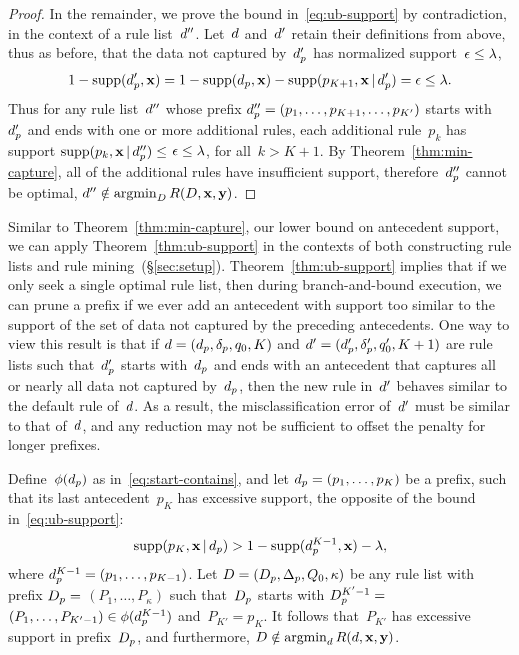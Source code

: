 \begin{proof}
In the remainder, we prove the bound in~\eqref{eq:ub-support} by contradiction,
in the context of a rule list~${d}''$.
%
Let~${d}$ and~${d}'$ retain their definitions from above,
thus as before, that the data not captured by~$d_p'$
has normalized support~${\epsilon \le {\lambda}}$, \ie
\begin{align*}
1 - \textnormal{supp}(d_p', \mathbf{x}) = 1 - \textnormal{supp}(d_p, \mathbf{x}) - \textnormal{supp}(p_{K+1}, \mathbf{x} \,|\, d_p') = \epsilon \le {\lambda}.
\end{align*}
Thus for any rule list~${d}''$ whose prefix
$d_p'' = (p_1, \dots, p_{K+1}, \dots, p_{K'})$ starts
with~$d_p'$ and ends with one or more additional rules,
each additional rule~$p_k$ has support
${\textnormal{supp}(p_k, \mathbf{x} \,|\, d_p'') \le}$ ${\epsilon \le {\lambda}}$,
for all~${k > K+1}$.
%
By Theorem~\ref{thm:min-capture},
all of the additional rules have insufficient support,
therefore~$d_p''$ cannot be optimal,
\ie ${{d}'' \notin \operatorname*{argmin}_{{D}} R({D}, \mathbf{x}, \mathbf{y})}$.
\end{proof}

Similar to Theorem~\ref{thm:min-capture}, our lower bound on
antecedent support, we can apply Theorem~\ref{thm:ub-support}
in the contexts of both constructing rule lists and
rule mining~(\S\ref{sec:setup}).
%
Theorem~\ref{thm:ub-support} implies that if we only seek a single
optimal rule list, then during branch-and-bound execution,
we can prune a prefix if we ever add an antecedent with support
too similar to the support of the set of data not captured by the
preceding antecedents.
%
One way to view this result is that if
${{d} = (d_p, \delta_p, q_0, K)}$
and ${{d}' = (d_p', \delta_p', q_0', K + 1)}$
are rule lists such that~$d_p'$ starts with~$d_p$
and ends with an antecedent that captures all or nearly all
data not captured by~$d_p$, then the new rule in~${d}'$
behaves similar to the default rule of~${d}$.
%
As a result, the misclassification error of~${d}'$ must be
similar to that of~${d}$, and any reduction may not be
sufficient to offset the penalty for longer prefixes.

\begin{proposition}
\label{prop:ub-support}
Define~$\phi(d_p)$ as in~\eqref{eq:start-contains},
and let ${d_p = (p_1, \dots, p_{K})}$ be a prefix,
such that its last antecedent~$p_{K}$ has excessive support,
\ie the opposite of the bound in~\eqref{eq:ub-support}:
\begin{align*}
\textnormal{supp}(p_K, \mathbf{x} \,|\, d_p) > 1 - \textnormal{supp}(d_p^{K-1}, \mathbf{x}) - {\lambda},
\end{align*}
where ${d_p^{K-1} = (p_1, \dots, p_{K-1})}$.
%
Let ${{D} = (D_p, \Delta_p, Q_0, \kappa)}$
be any rule list with prefix
${D_p =}$ ${(P_1, \dots, P_{\kappa})}$
such that~$D_p$ starts with ${D_p^{K'-1} =}$
${(P_1, \dots, P_{K'-1}) \in \phi(d_p^{K-1})}$
and~${P_{K'} = p_{K}}$.
%
It follows that~$P_{K'}$ has excessive support in prefix~$D_p$,
and furthermore, ${{D} \notin \operatorname*{argmin}_{{d}} R({d}, \mathbf{x}, \mathbf{y})}$.
\end{proposition}

